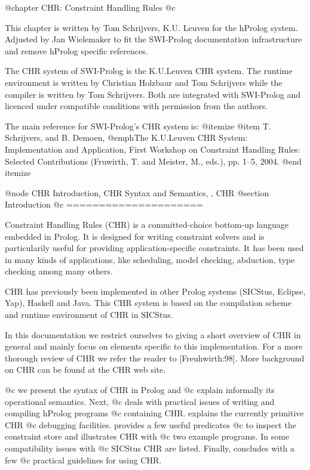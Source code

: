 @chapter CHR: Constraint Handling Rules 
@c 		\label{sec:chr}

This chapter is written by Tom Schrijvers, K.U. Leuven for the hProlog
system. Adjusted by Jan Wielemaker to fit the SWI-Prolog documentation
infrastructure and remove hProlog specific references.

The CHR system of SWI-Prolog is the K.U.Leuven CHR system.  The runtime
environment is written by Christian Holzbaur and Tom Schrijvers while the
compiler is written by Tom Schrijvers. Both are integrated with SWI-Prolog
and licenced under compatible conditions with permission from the authors.

The main reference for SWI-Prolog's CHR system is:
@itemize
@item T. Schrijvers, and B. Demoen, @emph{The K.U.Leuven CHR System: Implementation and Application}, First Workshop on Constraint Handling Rules: Selected
Contributions (Fruwirth, T. and Meister, M., eds.), pp. 1--5, 2004.
@end itemize

@node CHR Introduction, CHR Syntax and Semantics, , CHR
@section Introduction
@c =====================

Constraint Handling Rules (CHR) is a committed-choice bottom-up language
embedded in Prolog. It is designed for writing constraint solvers and is
particularily useful for providing application-specific constraints.
It has been used in many kinds of applications, like scheduling,
model checking, abduction, type checking among many others.

CHR has previously been implemented in other Prolog systems (SICStus,
Eclipse, Yap), Haskell and Java. This CHR system is based on the
compilation scheme and runtime environment of CHR in SICStus.

In this documentation we restrict ourselves to giving a short overview
of CHR in general and mainly focus on elements specific to this
implementation. For a more thorough review of CHR we refer the reader to
[Freuhwirth:98]. More background on CHR can be found at the CHR web site.

@c  we present the syntax of CHR in Prolog and
@c explain informally its operational semantics. Next, 
@c deals with practical issues of writing and compiling hProlog programs
@c containing CHR.  explains the currently primitive CHR
@c debugging facilities.  provides a few useful predicates
@c to inspect the constraint store and  illustrates CHR with
@c two example programs. In  some compatibility issues with
@c SICStus CHR are listed. Finally,  concludes with a few
@c practical guidelines for using CHR.



